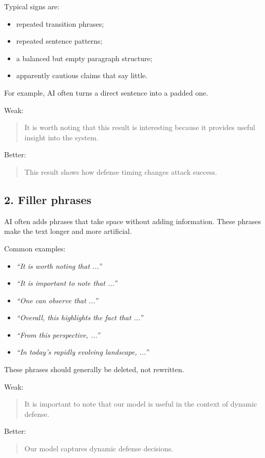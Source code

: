 \documentclass[11pt,a4paper]{article}
\theoremstyle{definition}
\begin{document}
Typical signs are:
\begin{itemize}
    \item repeated transition phrases;
    \item repeated sentence patterns;
    \item a balanced but empty paragraph structure;
    \item apparently cautious claims that say little.
\end{itemize}

For example, AI often turns a direct sentence into a padded one.

Weak:
\begin{quote}
It is worth noting that this result is interesting because it provides useful insight into the system.
\end{quote}

Better:
\begin{quote}
This result shows how defense timing changes attack success.
\end{quote}

\subsection*{2. Filler phrases}

AI often adds phrases that take space without adding information.
These phrases make the text longer and more artificial.

Common examples:
\begin{itemize}
    \item \textit{``It is worth noting that ...''}
    \item \textit{``It is important to note that ...''}
    \item \textit{``One can observe that ...''}
    \item \textit{``Overall, this highlights the fact that ...''}
    \item \textit{``From this perspective, ...''}
    \item \textit{``In today's rapidly evolving landscape, ...''}
\end{itemize}

These phrases should generally be deleted, not rewritten.

Weak:
\begin{quote}
It is important to note that our model is useful in the context of dynamic defense.
\end{quote}

Better:
\begin{quote}
Our model captures dynamic defense decisions.
\end{quote}
\end{document}
